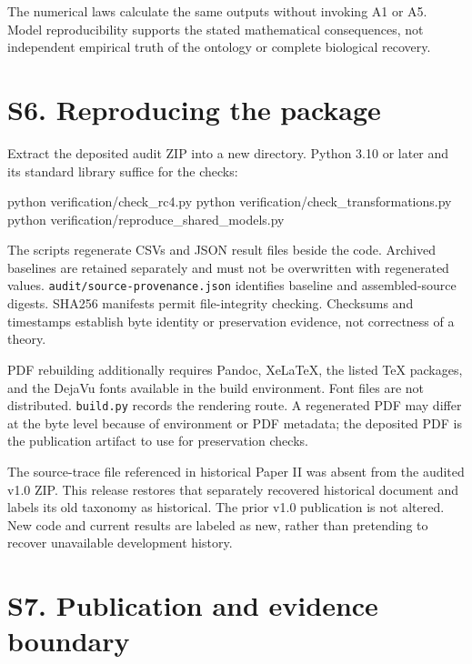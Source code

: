 \documentclass[
  11pt,
  a4paper,
]{article}
\newenvironment{Shaded}{}{}
\newcommand{\ExtensionTok}[1]{#1}
\newcommand{\NormalTok}[1]{#1}
\begin{document}
The numerical laws calculate the same outputs without invoking A1 or A5.
Model reproducibility supports the stated mathematical consequences, not
independent empirical truth of the ontology or complete biological
recovery.

\hypertarget{s6.-reproducing-the-package}{%
\section{S6. Reproducing the
package}\label{s6.-reproducing-the-package}}

Extract the deposited audit ZIP into a new directory. Python 3.10 or
later and its standard library suffice for the checks:

\begin{Shaded}
\begin{Highlighting}[]
\ExtensionTok{python}\NormalTok{ verification/check\_rc4.py}
\ExtensionTok{python}\NormalTok{ verification/check\_transformations.py}
\ExtensionTok{python}\NormalTok{ verification/reproduce\_shared\_models.py}
\end{Highlighting}
\end{Shaded}

The scripts regenerate CSVs and JSON result files beside the code.
Archived baselines are retained separately and must not be overwritten
with regenerated values. \texttt{audit/source-provenance.json}
identifies baseline and assembled-source digests. SHA256 manifests
permit file-integrity checking. Checksums and timestamps establish byte
identity or preservation evidence, not correctness of a theory.

PDF rebuilding additionally requires Pandoc, XeLaTeX, the listed TeX
packages, and the DejaVu fonts available in the build environment. Font
files are not distributed. \texttt{build.py} records the rendering
route. A regenerated PDF may differ at the byte level because of
environment or PDF metadata; the deposited PDF is the publication
artifact to use for preservation checks.

The source-trace file referenced in historical Paper II was absent from
the audited v1.0 ZIP. This release restores that separately recovered
historical document and labels its old taxonomy as historical. The prior
v1.0 publication is not altered. New code and current results are
labeled as new, rather than pretending to recover unavailable
development history.

\hypertarget{s7.-publication-and-evidence-boundary}{%
\section{S7. Publication and evidence
boundary}\label{s7.-publication-and-evidence-boundary}}
\end{document}
